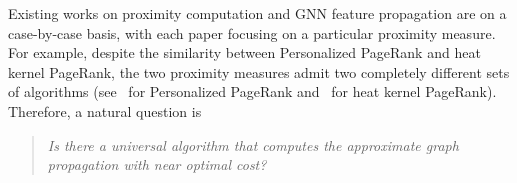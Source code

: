 Existing works on proximity computation and GNN feature propagation are on a case-by-case basis, with each paper focusing on a particular proximity measure. For example, despite the similarity between Personalized PageRank and heat kernel PageRank, the two proximity measures admit two completely different sets of algorithms (see~\cite{wei2018topppr,Wang2016HubPPR,jung2017bepi,Shin2015BEAR,coskun2016efficient} for Personalized PageRank and~\cite{yang2019TEA,chung2007HKPR,chung2018computing,kloster2014heat} for heat kernel PageRank). 
Therefore, a natural question is 
\begin{quote}
	{\em Is there a universal algorithm that computes the approximate graph propagation with near optimal cost? }
\end{quote}


 
 







